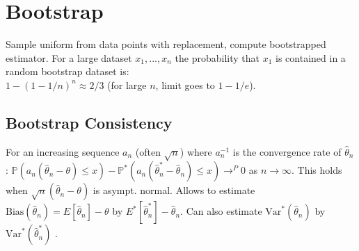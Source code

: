 \section{Bootstrap}
Sample uniform from data points with replacement, compute bootstrapped estimator. For a large dataset $x_1, ..., x_n$ the probability that $x_1$ is contained in a random bootstrap dataset is: \\
$1-(1-1/n)^n \approx 2/3$ (for large $n$, limit goes to $1-1/e$).
\subsection*{Bootstrap Consistency}
For an increasing sequence $a_n$ (often $\sqrt{n}$) where $a_n^{-1}$ is the convergence rate of $\hat \theta_n$:
$\mathbb{P}(a_n(\hat \theta_n - \theta) \leq x) - \mathbb{P}^*(a_n(\hat \theta_n^* - \hat \theta_n) \leq x) \to^P 0$ as $n\to \infty$. This holds when $\sqrt{n}(\hat \theta_n - \theta)$ is asympt. normal. Allows to estimate $\text{Bias}(\hat \theta_n) = E[\hat \theta_n] - \theta$ by $E^*[\hat \theta^*_n] - \hat \theta_n$. Can also estimate $\text{Var}^*(\hat\theta_n)$ by $\text{Var}^*(\hat\theta^*_n)$ .
